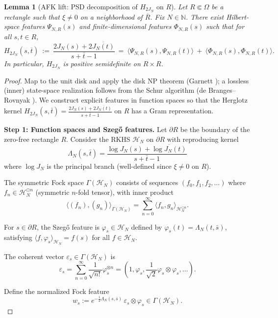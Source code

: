 \documentclass[11pt]{article}
\newtheorem{lemma}[theorem]{Lemma}
\theoremstyle{definition}
\theoremstyle{remark}
\begin{document}
\begin{lemma}[AFK lift: PSD decomposition of \(H_{2J_N}\) on \(R\)]\label{lem:AFK}
Let \(R\Subset\Omega\) be a rectangle such that \(\xi\neq 0\) on a neighborhood of \(\overline R\). Fix \(N\in\mathbb N\). There exist Hilbert-space features \(\Psi_{N,R}(s)\) and finite-dimensional features \(\Phi_{N,R}(s)\) such that for all \(s,t\in R\),
\[
 H_{2J_N}(s,\overline t)\ :=\ \frac{2J_N(s)+2\overline{J_N(t)}}{s+\overline t-1}\ =\ \big\langle\Psi_{N,R}(s),\Psi_{N,R}(t)\big\rangle\ +\ \big\langle\Phi_{N,R}(s),\Phi_{N,R}(t)\big\rangle.
\]
In particular, \(H_{2J_N}\) is positive semidefinite on \(R\times R\).
\end{lemma}
\begin{proof}
Map to the unit disk and apply the disk NP theorem (Garnett \cite[Ch.~V]{Garnett}); a lossless (inner) state-space realization follows from the Schur algorithm (de Branges--Rovnyak \cite[Ch.~II]{deBrangesRovnyak}).
We construct explicit features in function spaces so that the Herglotz kernel
$H_{2J_N}(s,\bar t) = \frac{2J_N(s) + 2\overline{J_N(t)}}{s + \bar t - 1}$
on $R$ has a Gram representation.

\medskip
\noindent\textbf{Step 1: Function spaces and Szegő features.}
Let $\partial R$ be the boundary of the zero-free rectangle $R$. Consider the RKHS $\mathcal{H}_N$ on $\partial R$ with reproducing kernel
\[
  \Lambda_N(s,\bar t) = \frac{\log J_N(s) + \overline{\log J_N(t)}}{s + \bar t - 1}
\]
where $\log J_N$ is the principal branch (well-defined since $\xi \neq 0$ on $R$).

The symmetric Fock space $\Gamma(\mathcal{H}_N)$ consists of sequences $(f_0, f_1, f_2, \ldots)$ where $f_n \in \mathcal{H}_N^{\odot n}$ (symmetric $n$-fold tensor), with inner product
\[
  \langle (f_n), (g_n) \rangle_{\Gamma(\mathcal{H}_N)} = \sum_{n=0}^\infty \langle f_n, g_n \rangle_{\mathcal{H}_N^{\odot n}}.
\]

For $s \in \partial R$, the Szegő feature is $\varphi_s \in \mathcal{H}_N$ defined by $\varphi_s(t) = \Lambda_N(t,\bar s)$, satisfying $\langle f, \varphi_s \rangle_{\mathcal{H}_N} = f(s)$ for all $f \in \mathcal{H}_N$.

The coherent vector $\varepsilon_s \in \Gamma(\mathcal{H}_N)$ is
\[
  \varepsilon_s = \sum_{n=0}^\infty \frac{1}{\sqrt{n!}} \varphi_s^{\otimes n} = (1, \varphi_s, \frac{1}{\sqrt{2}} \varphi_s \otimes \varphi_s, \ldots).
\]

Define the normalized Fock feature
\[
  w_s := e^{-\frac{1}{2}\Lambda_N(s,\bar s)} \, \varepsilon_s \otimes \varphi_s \in \Gamma(\mathcal{H}_N).
\]


\end{proof}
\end{document}
